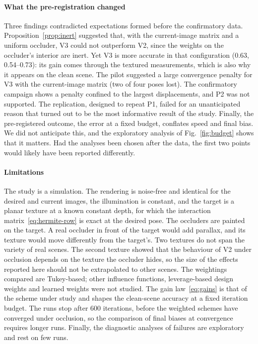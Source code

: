 \documentclass[preprint,12pt]{elsarticle}
\theoremstyle{remark}
\begin{document}
\paragraph{What the pre-registration changed}
Three findings contradicted expectations formed before the confirmatory data.
Proposition~\ref{prop:inert} suggested that, with the current-image matrix and
a uniform occluder, V3 could not outperform V2, since the weights on the
occluder's interior are inert. Yet V3 is more accurate in that configuration
(0.63, 0.54--0.73): its gain comes through the textured measurements, which is
also why it appears on the clean scene. The pilot suggested a large convergence
penalty for V3 with the current-image matrix (two of four poses lost). The
confirmatory campaign shows a penalty confined to the largest displacements,
and P2 was not supported. The replication, designed to repeat P1, failed for an
unanticipated reason that turned out to be the most informative result of the
study. Finally, the pre-registered outcome, the error at a fixed budget,
conflates speed and final bias. We did not anticipate this, and the
exploratory analysis of Fig.~\ref{fig:budget} shows that it matters. Had the analyses been chosen after the data, the first two
points would likely have been reported differently.

\paragraph{Limitations}
The study is a simulation. The rendering is noise-free and identical for the
desired and current images, the illumination is constant, and the target is a
planar texture at a known constant depth, for which the interaction
matrix~\eqref{eq:hermite-row} is exact at the desired pose. The occluders are
painted on the target. A real occluder in front of the target would add
parallax, and its texture would move differently from the target's. Two
textures do not span the variety of real scenes. The second texture showed that
the behaviour of V2 under occlusion depends on the texture the occluder hides,
so the size of the effects reported here should not be extrapolated to other
scenes. The weightings compared are Tukey-based; other influence functions,
leverage-based design weights and learned weights were not studied. The gain
law~\eqref{eq:gains} is that of the scheme under study and shapes the
clean-scene accuracy at a fixed iteration budget. The runs stop after 600 iterations, before
the weighted schemes have converged under occlusion, so the comparison of
final biases at convergence requires longer runs. Finally, the diagnostic
analyses of failures are exploratory and rest on few runs.
\end{document}
